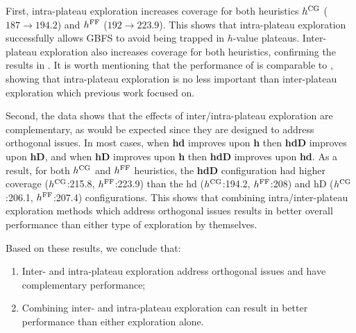 First, 
% 
intra-plateau exploration  increases coverage for both heuristics
$\text{$h^\text{CG}$}$ ($187 \rightarrow 194.2$) and $\text{$h^\text{FF}$}$ ($192 \rightarrow 223.9$).
This shows that intra-plateau exploration successfully allows GBFS to avoid being trapped in $h$-value plateaus.
Inter-plateau exploration  also increases coverage for both heuristics, confirming the results in \cite{xie14type}.
It is worth mentioning that the performance of  is comparable to , showing that intra-plateau exploration is no less important than inter-plateau exploration which previous work focused on.

Second, the data shows that the effects of inter/intra-plateau exploration are complementary, 
as would be expected since they are designed to address orthogonal issues.
In most cases,
when \textbf{hd} improves upon \textbf{h} then \textbf{hdD} improves upon \textbf{hD},
and when \textbf{hD} improves upon \textbf{h} then \textbf{hdD} improves upon \textbf{hd}.
As a result, for both $\text{$h^\text{CG}$}$ and $\text{$h^\text{FF}$}$ heuristics, the \textbf{hdD} configuration had higher coverage ($\text{$h^\text{CG}$}$:215.8, $\text{$h^\text{FF}$}$:223.9) than the hd ($\text{$h^\text{CG}$}$:194.2, $\text{$h^\text{FF}$}$:208) and hD ($\text{$h^\text{CG}$}$:206.1, $\text{$h^\text{FF}$}$:207.4) configurations. 
This shows that combining intra/inter-plateau exploration methods which address orthogonal issues results in better overall performance than either type of exploration by themselves.

% 



Based on these results, we conclude that:
\begin{enumerate} %
\item Inter- and intra-plateau exploration address orthogonal issues and have complementary performance; 
\item Combining inter- and intra-plateau exploration can result in better performance than either  exploration alone.
\end{enumerate}

